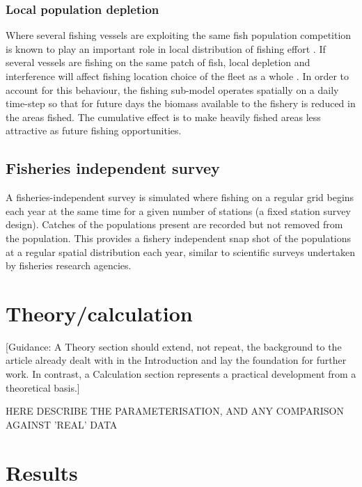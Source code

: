 \documentclass[review]{elsarticle}
\begin{document}
\subsubsection{Local population depletion}

Where several fishing vessels are exploiting the same fish population
competition is known to play an important role in local distribution of fishing
effort \cite{Gillis1998}. If several vessels are fishing on the same patch of
fish, local depletion and interference will affect fishing location choice of
the fleet as a whole \cite{Rijnsdorp2000, Poos2007a}. In order to account for
this behaviour, the fishing sub-model operates spatially on a daily time-step
so that for future days the biomass available to the fishery is reduced in the
areas fished. The cumulative effect is to make heavily fished areas less
attractive as future fishing opportunities. \\

\subsection{Fisheries independent survey}

A fisheries-independent survey is simulated where fishing on a regular grid
begins each year at the same time for a given number of stations (a fixed
station survey design). Catches of the populations present are recorded but not
removed from the population. This provides a fishery independent snap shot of
the populations at a regular spatial distribution each year, similar to
scientific surveys undertaken by fisheries research agencies. \\

\section{Theory/calculation}

[Guidance: A Theory section should extend, not repeat, the background to the
article already dealt with in the Introduction and lay the foundation for
further work.  In contrast, a Calculation section represents a practical
development from a theoretical basis.]

HERE DESCRIBE THE PARAMETERISATION, AND ANY COMPARISON AGAINST 'REAL' DATA

\section{Results}
\end{document}
